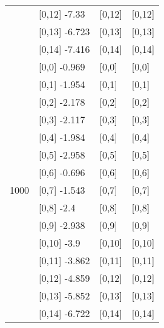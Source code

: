 \begin{table}
\begin{tabular}[t]{llll}
 & {}[0,12] -7.33 & {}[0,12] & {}[0,12]\\
 & {}[0,13] -6.723 & {}[0,13] & {}[0,13]\\
 & {}[0,14] -7.416 & {}[0,14] & {}[0,14]\\
\addlinespace
 & {}[0,0] -0.969 & {}[0,0] & {}[0,0]\\
 & {}[0,1] -1.954 & {}[0,1] & {}[0,1]\\
 & {}[0,2] -2.178 & {}[0,2] & {}[0,2]\\
 & {}[0,3] -2.117 & {}[0,3] & {}[0,3]\\
 & {}[0,4] -1.984 & {}[0,4] & {}[0,4]\\
\addlinespace
 & {}[0,5] -2.958 & {}[0,5] & {}[0,5]\\
 & {}[0,6] -0.696 & {}[0,6] & {}[0,6]\\
1000 & {}[0,7] -1.543 & {}[0,7] & {}[0,7]\\
 & {}[0,8] -2.4 & {}[0,8] & {}[0,8]\\
 & {}[0,9] -2.938 & {}[0,9] & {}[0,9]\\
\addlinespace
 & {}[0,10] -3.9 & {}[0,10] & {}[0,10]\\
 & {}[0,11] -3.862 & {}[0,11] & {}[0,11]\\
 & {}[0,12] -4.859 & {}[0,12] & {}[0,12]\\
 & {}[0,13] -5.852 & {}[0,13] & {}[0,13]\\
 & {}[0,14] -6.722 & {}[0,14] & {}[0,14]\\
\bottomrule
\end{tabular}
\end{table}
